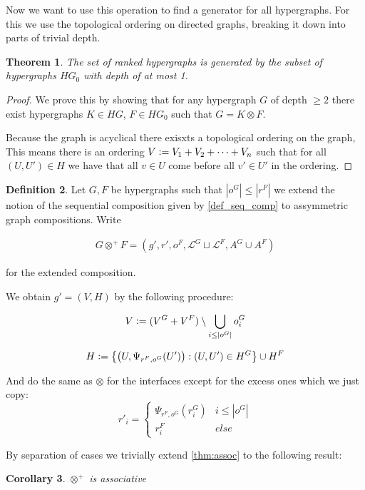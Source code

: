 \documentclass[12pt]{article}
\newtheorem{theorem}{Theorem}[section]
\newtheorem{corollary}[theorem]{Corollary}
\theoremstyle{definition}
\newtheorem{definition}[theorem]{Definition}
\newcommand{\defeq}{\vcentcolon=}
\newcommand{\1}{\mathbbm{1}}
\renewcommand{\L}{\mathcal{L}}
\begin{document}
Now we want to use this operation to find a generator for all hypergraphs. For this we use the topological ordering on directed graphs, breaking it down into parts of trivial depth.

\begin{theorem}
    The set of ranked hypergraphs is generated by the subset of hypergraphs $HG_0$ with depth of at most 1. 
\end{theorem}

\begin{proof}
    We prove this by showing that for any hypergraph $G$ of depth $\geq 2$ there exist hypergraphs $K\in HG$, $F\in HG_0$ such that $G = K\otimes F$.

    Because the graph is acyclical there exisxts a topological ordering on the graph, This means there is an ordering $V \defeq V_1 + V_2 + \dots + V_n$ such that for all $(U,U') \in H$ we have that all $v\in U$ come before all $v'\in U'$ in the ordering.
\end{proof}

\begin{definition}
    Let $G,F$ be hypergraphs such that $|o^G| \leq |r^F|$ we extend the notion of the sequential composition given by \ref{def_seq_comp} to assymmetric graph compositions. Write 

    \begin{align*}
        G\otimes^+ F = (g', r', o^F, \L^G\sqcup \L^F, A^G\cup A^F)
    \end{align*}

    for the extended composition.

    We obtain $g' = (V,H)$ by the following procedure:

    \[
        V \defeq (V^G + V^F) \setminus \bigcup_{i\leq |o^G|}o^G_i    
    \]
    
    \[
        H \defeq \left\{ \left(U, \Psi_{r^F, o^G}(U')\right) : (U, U') \in H^G \right\} \cup H^F
    \]

    And do the same as $\otimes$ for the interfaces except for the excess ones which we just copy:
    \[
        r'_i = 
        \begin{cases}
            \Psi_{r^F, o^G}(r^G_i) & i\leq |o^G|\\
            r^F_i & else
        \end{cases}
    \]
\end{definition}

By separation of cases we trivially extend \ref{thm:assoc} to the following result:
\begin{corollary}
    $\otimes^+$ is associative
\end{corollary}
\end{document}
